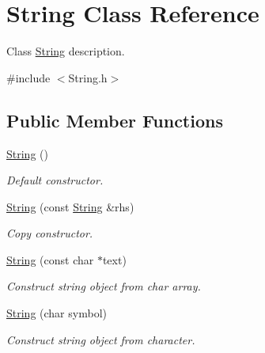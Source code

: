\hypertarget{class_string}{}\section{String Class Reference}
\label{class_string}


Class \hyperlink{class_string}{String} description.  




{\ttfamily \#include $<$String.\+h$>$}

\subsection*{Public Member Functions}
\begin{DoxyCompactItemize}
\item 
\mbox{\label{class_string_a8a7ef356e05eb9b1ea1ab518baee3095}} 
\hyperlink{class_string_a8a7ef356e05eb9b1ea1ab518baee3095}{String} ()
\begin{DoxyCompactList}\small\item\em Default constructor. \end{DoxyCompactList}\item 
\mbox{\label{class_string_a117f8a4ef8cd2c6b3632324b0146d7ae}} 
\hyperlink{class_string_a117f8a4ef8cd2c6b3632324b0146d7ae}{String} (const \hyperlink{class_string}{String} \&rhs)
\begin{DoxyCompactList}\small\item\em Copy constructor. \end{DoxyCompactList}\item 
\mbox{\label{class_string_a536209bdc6da85c29369073bed2bfd45}} 
\hyperlink{class_string_a536209bdc6da85c29369073bed2bfd45}{String} (const char $\ast$text)
\begin{DoxyCompactList}\small\item\em Construct string object from char array. \end{DoxyCompactList}\item 
\mbox{\label{class_string_a8c3550b6c85fb4925d8afa67a6fdc867}} 
\hyperlink{class_string_a8c3550b6c85fb4925d8afa67a6fdc867}{String} (char symbol)
\begin{DoxyCompactList}\small\item\em Construct string object from character. \end{DoxyCompactList}\item 

\end{DoxyCompactItemize}
